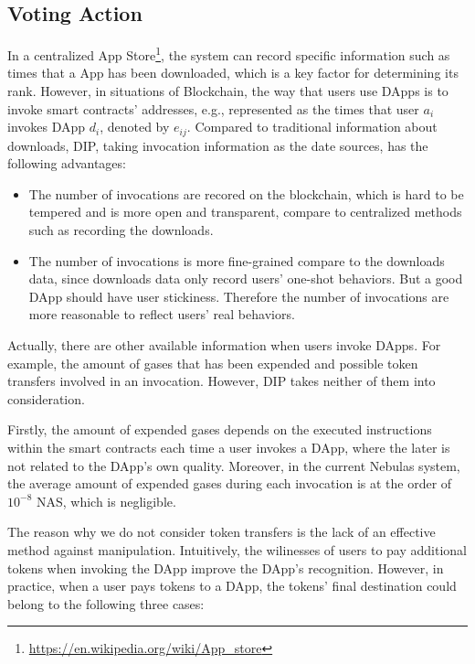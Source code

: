  \subsection{Voting Action}
 \label{subsection:voting}
 \noindent
  In a centralized App Store\footnote{\url{https://en.wikipedia.org/wiki/App\_store}}, the system can record specific information such as times that a App has been downloaded, which is a key factor for determining its rank. However, in situations of Blockchain, the way that users use DApps is to invoke smart contracts' addresses, e.g., represented as the times that user $a_i$ invokes DApp $d_i$, denoted by  $e_{ij}$. Compared to traditional information about downloads, DIP, taking invocation information as the date sources, has the following advantages:

 \begin{itemize}
 	\item The number of invocations are recored on the blockchain, which is hard to be tempered and is more open and transparent, compare to centralized methods such as recording the downloads.
 	\item The number of invocations is more fine-grained compare to the downloads data, since downloads data only record users' one-shot behaviors. But a good DApp should have user stickiness. Therefore the number of invocations are more reasonable to reflect users' real behaviors.

\end{itemize}

 Actually, there are other available information when users invoke DApps. For example, the amount of gases that has been expended and possible token transfers involved in an invocation. However, DIP takes neither of them into consideration.

 Firstly, the amount of expended gases depends on the executed instructions within the smart contracts each time a user invokes a DApp, where the later is not related to the DApp's own quality. Moreover, in the current Nebulas system, the average amount of expended gases during each invocation is at the order of $10^{-8}$ NAS, which is negligible.

 The reason why we do not consider token transfers is the lack of an effective method against manipulation. Intuitively, the wilinesses of users to pay additional tokens when invoking the DApp improve the DApp's recognition.
  However, in practice, when a user pays tokens to a DApp, the tokens' final destination could belong to the following three cases:

